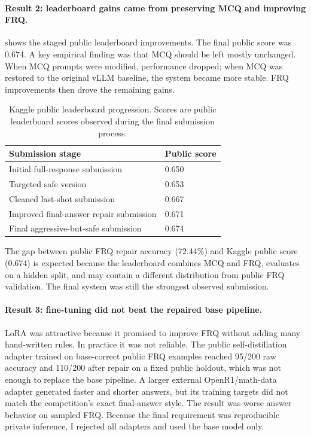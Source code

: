 \documentclass{article}
\begin{document}
\paragraph{Result 2: leaderboard gains came from preserving MCQ and improving FRQ.}
 shows the staged public leaderboard improvements. The final public score was 0.674. A key empirical finding was that MCQ should be left mostly unchanged. When MCQ prompts were modified, performance dropped; when MCQ was restored to the original vLLM baseline, the system became more stable. FRQ improvements then drove the remaining gains.

\begin{table}[h]
\caption{Kaggle public leaderboard progression. Scores are public leaderboard scores observed during the final submission process.}
\label{tab:kaggle_progress}
\centering
\begin{tabular}{ll}
\toprule
Submission stage & Public score \\
\midrule
Initial full-response submission & 0.650 \\
Targeted safe version & 0.653 \\
Cleaned last-shot submission & 0.667 \\
Improved final-answer repair submission & 0.671 \\
Final aggressive-but-safe submission & 0.674 \\
\bottomrule
\end{tabular}
\end{table}

The gap between public FRQ repair accuracy (72.44\%) and Kaggle public score (0.674) is expected because the leaderboard combines MCQ and FRQ, evaluates on a hidden split, and may contain a different distribution from public FRQ validation. The final system was still the strongest observed submission.

\paragraph{Result 3: fine-tuning did not beat the repaired base pipeline.}
LoRA was attractive because it promised to improve FRQ without adding many hand-written rules. In practice it was not reliable. The public self-distillation adapter trained on base-correct public FRQ examples reached 95/200 raw accuracy and 110/200 after repair on a fixed public holdout, which was not enough to replace the base pipeline. A larger external OpenR1/math-data adapter generated faster and shorter answers, but its training targets did not match the competition's exact final-answer style. The result was worse answer behavior on sampled FRQ. Because the final requirement was reproducible private inference, I rejected all adapters and used the base model only.
\end{document}
